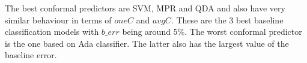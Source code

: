 The best conformal predictors are SVM, MPR and QDA and also have very similar behaviour in terms
of $oneC$ and $avgC$. These are the 3 best baseline classification models with $b\_err$ being 
around 5\%. The worst conformal predictor is the one based on Ada classifier. The latter also
has the largest value of the baseline error.





%


